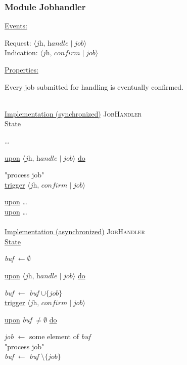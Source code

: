 \documentclass{article}
\begin{document}
\begin{adjustwidth}{2em}{2em}
\begin{adjustwidth}{2em}{2em}
			\subsubsection{Module Jobhandler}
			\begin{adjustwidth}{2em}{}
				\underline{Events:}
				\begin{adjustwidth}{1em}{}
					Request: $\langle \textit{jh, handle} \mid \textit{job} \rangle$ \\
					Indication: $\langle \textit{jh, confirm} \mid \textit{job} \rangle$
				\end{adjustwidth}
				\underline{Properties:}
				\begin{adjustwidth}{1em}{}
					Every job submitted for handling is eventually confirmed.
				\end{adjustwidth}
				\hfill \\
				\underline{Implementation (synchronized)} \textsc{JobHandler} \\
				\underline{State}
				\begin{adjustwidth}{1em}{}
					\ldots
				\end{adjustwidth}
				\underline{upon} $\langle \textit{jh, handle} \mid \textit{job} \rangle$ \underline{do}
				\begin{adjustwidth}{1em}{}
					"process job" \\
					\underline{trigger} $\langle \textit{jh, confirm} \mid \textit{job} \rangle$
				\end{adjustwidth}
				\vspace{0.2cm}
				\underline{upon} \ldots \\
				\underline{upon} \ldots \\ \\
				\underline{Implementation (asynchronized)} \textsc{JobHandler} \\
				\underline{State}
				\begin{adjustwidth}{1em}{}
					\textit{buf} $\leftarrow \emptyset$
				\end{adjustwidth}
				\underline{upon} $\langle \textit{jh, handle} \mid \textit{job} \rangle$ \underline{do}
				\begin{adjustwidth}{1em}{}
					\textit{buf} $\leftarrow$ \textit{buf} $\cup \{ \textit{job} \}$ \\
					\underline{trigger} $\langle \textit{jh, confirm} \mid \textit{job} \rangle$
				\end{adjustwidth}
				\vspace{0.2cm}
				\underline{upon} \textit{buf} $\neq \emptyset$ \underline{do}
				\begin{adjustwidth}{1em}{}
					\textit{job} $\leftarrow$ some element of \textit{buf} \\
					"process job" \\
					\textit{buf} $\leftarrow$ \textit{buf} $\setminus \{ \textit{job} \}$
				\end{adjustwidth}
			\end{adjustwidth}
		\end{adjustwidth}

\end{adjustwidth}
\end{document}
